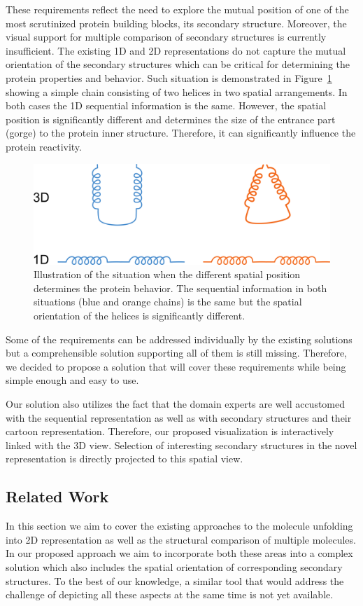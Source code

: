 \documentclass[twocolumn]{bmcart}%
\begin{document}
These requirements reflect the need to explore the mutual position of one of the most scrutinized protein building blocks, its secondary structure.
Moreover, the visual support for multiple comparison of secondary structures is currently insufficient.
The existing 1D and 2D representations do not capture the mutual orientation of the secondary structures which can be critical for determining the protein properties and behavior.
Such situation is demonstrated in Figure~\ref{fig:mutual_pos} showing a simple chain consisting of two helices in two spatial arrangements.
In both cases the 1D sequential information is the same.
However, the spatial position is significantly different and determines the size of the entrance part (gorge) to the protein inner structure.
Therefore, it can significantly influence the protein reactivity.

\begin{figure}[t!]
  \centering
  \includegraphics[width=0.9\columnwidth]{pics/angles.png}
  \caption{Illustration of the situation when the different spatial position determines the protein behavior. The sequential information in both situations (blue and orange chains) is the same but the spatial orientation of the helices is significantly different.}
  \label{fig:mutual_pos}
\end{figure}

Some of the requirements can be addressed individually by the existing solutions but a comprehensible solution supporting all of them is still missing.
Therefore, we decided to propose a solution that will cover these requirements while being simple enough and easy to use. 

Our solution also utilizes the fact that the domain experts are well accustomed with the sequential representation as well as with secondary structures and their cartoon representation. 
Therefore, our proposed visualization is interactively linked with the 3D view.
Selection of interesting secondary structures in the novel representation is directly projected to this spatial view. 


\subsection*{Related Work}
In this section we aim to cover the existing approaches to the molecule unfolding into 2D representation as well as the structural comparison of multiple molecules.
In our proposed approach we aim to incorporate both these areas into a complex solution which also includes the spatial orientation of corresponding secondary structures.
To the best of our knowledge, a similar tool that would address the challenge of depicting all these aspects at the same time is not yet available. 
\end{document}
